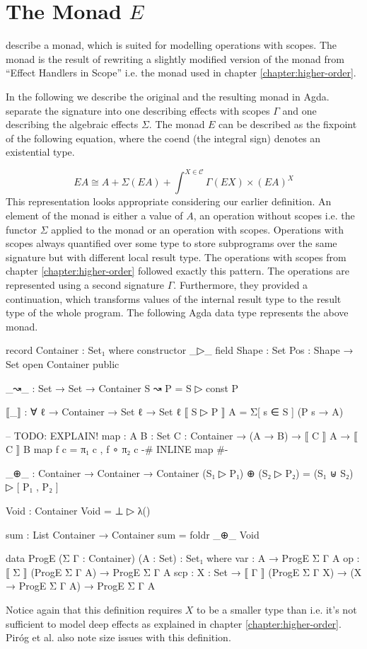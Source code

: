 \section{The Monad $E$}

\textcite{DBLP:conf/lics/PirogSWJ18} describe a monad, which is suited for
modelling operations with scopes.
The monad is the result of rewriting a slightly modified version of the monad
from ``Effect Handlers in Scope'' i.e. the monad used in chapter
\ref{chapter:higher-order}.

In the following we describe the original and the resulting monad in Agda.
\textcite{DBLP:conf/lics/PirogSWJ18} separate the signature into one describing
effects with scopes $\Gamma$ and one describing the algebraic effects $\Sigma$.
The monad $E$ can be described as the fixpoint of the following equation, where
the coend (the integral sign) denotes an existential type.

\[
  EA \cong A + \Sigma{}(EA) + \int^{X\in\mathscr{C}} \Gamma{}(EX) \times (EA)^X
\]
This representation looks appropriate considering our earlier definition.
An element of the monad is either a value of $A$, an operation without scopes
i.e. the functor $\Sigma$ applied to the monad or an operation with scopes.
Operations with scopes always quantified over some type to store subprograms
over the same signature but with different local result type.
The operations with scopes from chapter \ref{chapter:higher-order} followed
exactly this pattern.
The operations are represented using a second signature $\Gamma$.
Furthermore, they provided a continuation, which transforms values of the
internal result type to the result type of the whole program.
The following Agda data type represents the above monad.

\begin{code}[hide]
record Container : Set₁ where
  constructor _▷_
  field
    Shape : Set
    Pos : Shape → Set
open Container public

_↝_ : Set → Set → Container
S ↝ P = S ▷ const P

⟦_⟧ : ∀ {ℓ} → Container → Set ℓ → Set ℓ
⟦ S ▷ P ⟧ A = Σ[ s ∈ S ] (P s → A)

-- TODO: EXPLAIN!
map : {A B : Set} {C : Container} → (A → B) → ⟦ C ⟧ A → ⟦ C ⟧ B
map f c = π₁ c , f ∘ π₂ c
{-# INLINE map #-}

_⊕_ : Container → Container → Container
(S₁ ▷ P₁) ⊕ (S₂ ▷ P₂) = (S₁ ⊎ S₂) ▷ [ P₁ , P₂ ]

Void : Container
Void = ⊥ ▷ λ()

sum : List Container → Container
sum = foldr _⊕_ Void

\end{code}
\begin{code}
data ProgE (Σ Γ : Container) (A : Set) : Set₁ where
  var  : A → ProgE Σ Γ A
  op   : ⟦ Σ ⟧ (ProgE Σ Γ A) → ProgE Σ Γ A
  scp  : {X : Set} → ⟦ Γ ⟧ (ProgE Σ Γ X) → (X → ProgE Σ Γ A) → ProgE Σ Γ A
\end{code}
Notice again that this definition requires $X$ to be a smaller type than
 i.e. it's not sufficient to model deep effects as explained in
chapter \ref{chapter:higher-order}.
Piróg et al. also note size issues with this definition.

